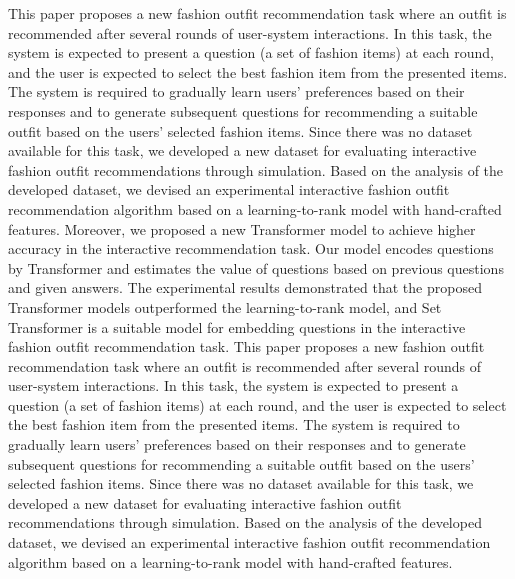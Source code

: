\begin{abst}
This paper proposes a new fashion outfit recommendation task 
where an outfit is recommended after several rounds of user-system interactions.
In this task, the system is expected to present a question (a set of fashion items) at each round, 
and the user is expected to select the best fashion item from the presented items. 
The system is required to gradually learn users' preferences based on their responses and to generate 
subsequent questions for recommending a suitable outfit based on the users' selected fashion items. 
Since there was no dataset available for this task,
we developed a new dataset for evaluating interactive fashion outfit recommendations through simulation.
Based on the analysis of the developed dataset, 
we devised an experimental interactive fashion outfit recommendation algorithm based on a learning-to-rank model
with hand-crafted features. 
Moreover, we proposed a new Transformer model to achieve higher accuracy in the interactive recommendation task. 
Our model encodes questions by Transformer
and estimates the value of questions based on previous questions and given answers.
The experimental results demonstrated that 
the proposed Transformer models outperformed the learning-to-rank model,
and Set Transformer is a suitable model for embedding questions in the interactive fashion outfit recommendation task.
This paper proposes a new fashion outfit recommendation task 
where an outfit is recommended after several rounds of user-system interactions.
In this task, the system is expected to present a question (a set of fashion items) at each round, 
and the user is expected to select the best fashion item from the presented items. 
The system is required to gradually learn users' preferences based on their responses and to generate 
subsequent questions for recommending a suitable outfit based on the users' selected fashion items. 
Since there was no dataset available for this task,
we developed a new dataset for evaluating interactive fashion outfit recommendations through simulation.
Based on the analysis of the developed dataset, 
we devised an experimental interactive fashion outfit recommendation algorithm based on a learning-to-rank model
with hand-crafted features. 
\end{abst}